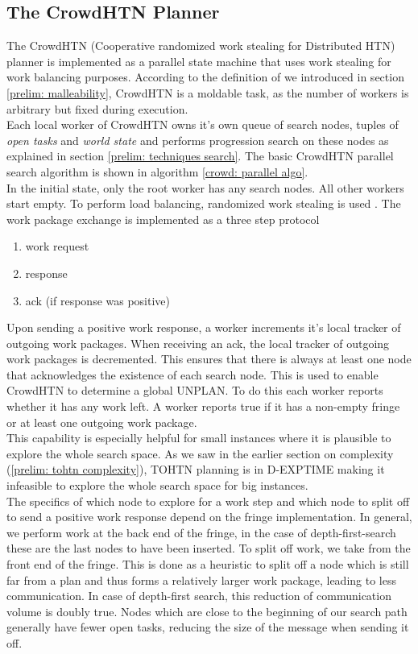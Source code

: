 \subsection{The CrowdHTN Planner}
\label{prelim: crowdhtn}
The CrowdHTN (Cooperative randomized work stealing for Distributed HTN) planner is implemented as a parallel state machine that uses work stealing for work balancing purposes. According to the definition of \cite{feitelson1997job} we introduced in section \ref{prelim: malleability}, CrowdHTN is a moldable task, as the number of workers is arbitrary but fixed during execution. \\
Each local worker of CrowdHTN owns it's own queue of search nodes, tuples of \textit{open tasks} and \textit{world state} and performs progression search on these nodes as explained in section \ref{prelim: techniques search}. The basic CrowdHTN parallel search algorithm is shown in algorithm \ref{crowd: parallel algo}. \\
In the initial state, only the root worker has any search nodes. All other workers start empty. To perform load balancing, randomized work stealing is used . The work package exchange is implemented as a three step protocol
\begin{enumerate}
	\item work request
	\item response
	\item ack (if response was positive)
\end{enumerate}
Upon sending a positive work response, a worker increments it's local tracker of outgoing work packages. When receiving an ack, the local tracker of outgoing work packages is decremented. This ensures that there is always at least one node that acknowledges the existence of each search node. This is used to enable CrowdHTN to determine a global UNPLAN. To do this each worker reports whether it has any work left. A worker reports true if it has a non-empty fringe or at least one outgoing work package. \\
This capability is especially helpful for small instances where it is plausible to explore the whole search space. As we saw in the earlier section on complexity (\ref{prelim: tohtn complexity}), TOHTN planning is in D-EXPTIME making it infeasible to explore the whole search space for big instances.\\
The specifics of which node to explore for a work step and which node to split off to send a positive work response depend on the fringe implementation. In general, we perform work at the back end of the fringe, in the case of depth-first-search these are the last nodes to have been inserted. To split off work, we take from the front end of the fringe. This is done as a heuristic to split off a node which is still far from a plan and thus forms a relatively larger work package, leading to less communication. In case of depth-first search, this reduction of communication volume is doubly true. Nodes which are close to the beginning of our search path generally have fewer open tasks, reducing the size of the message when sending it off.
